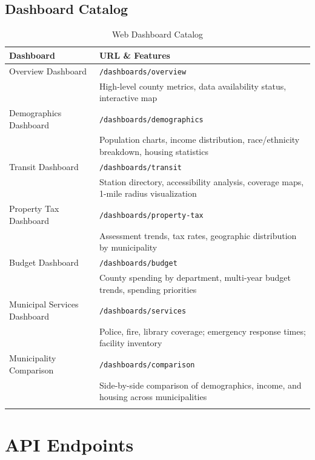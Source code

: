 \documentclass[11pt,letterpaper]{article}
\begin{document}
\subsection{Dashboard Catalog}

\begin{longtable}{p{5cm}p{10cm}}
\toprule
\textbf{Dashboard} & \textbf{URL \& Features} \\
\midrule
\endhead

Overview Dashboard & 
\texttt{/dashboards/overview} \\
& High-level county metrics, data availability status, interactive map \\

Demographics Dashboard & 
\texttt{/dashboards/demographics} \\
& Population charts, income distribution, race/ethnicity breakdown, housing statistics \\

Transit Dashboard & 
\texttt{/dashboards/transit} \\
& Station directory, accessibility analysis, coverage maps, 1-mile radius visualization \\

Property Tax Dashboard & 
\texttt{/dashboards/property-tax} \\
& Assessment trends, tax rates, geographic distribution by municipality \\

Budget Dashboard & 
\texttt{/dashboards/budget} \\
& County spending by department, multi-year budget trends, spending priorities \\

Municipal Services Dashboard & 
\texttt{/dashboards/services} \\
& Police, fire, library coverage; emergency response times; facility inventory \\

Municipality Comparison & 
\texttt{/dashboards/comparison} \\
& Side-by-side comparison of demographics, income, and housing across municipalities \\

\bottomrule
\caption{Web Dashboard Catalog}
\end{longtable}

\section{API Endpoints}
\end{document}
